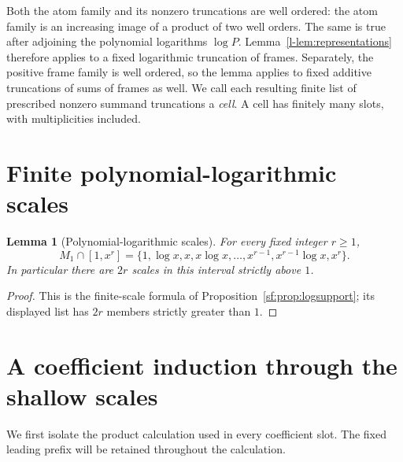 \documentclass[11pt]{article}
\newtheorem{lemma}[theorem]{Lemma}
\theoremstyle{definition}
\theoremstyle{remark}
\numberwithin{equation}{section}
\begin{document}
Both the atom family and its nonzero truncations are well ordered:
the atom family is an increasing image of a product of two well
orders.  The same is true after adjoining the polynomial logarithms
$\log P$.  Lemma~\ref{l-lem:representations} therefore applies to a
fixed logarithmic truncation of frames. Separately, the positive
frame family is well ordered, so the lemma applies to fixed
additive truncations of sums of frames as well.  We call each resulting finite list of prescribed nonzero
summand truncations a \emph{cell}.  A cell has finitely many slots,
with multiplicities included.



\section{Finite polynomial-logarithmic scales}

\begin{lemma}[Polynomial-logarithmic scales]\label{f-lem:scales}
For every fixed integer \(r\ge1\),
\begin{equation}
 M_1\cap[1,x^r]
 =\{1,\log x,x,x\log x,\ldots,
                         x^{r-1},x^{r-1}\log x,x^r\}.
 \label{f-eq-2.3}
\end{equation}
In particular there are \(2r\) scales in this interval strictly
above \(1\).
\end{lemma}
\begin{proof}
This is the finite-scale formula of
Proposition~\ref{sf:prop:logsupport}; its displayed list has
$2r$ members strictly greater than $1$.
\end{proof}

\section{A coefficient induction through the shallow scales}

We first isolate the product calculation used in every coefficient
slot.  The fixed leading prefix will be retained throughout the calculation.
\end{document}
